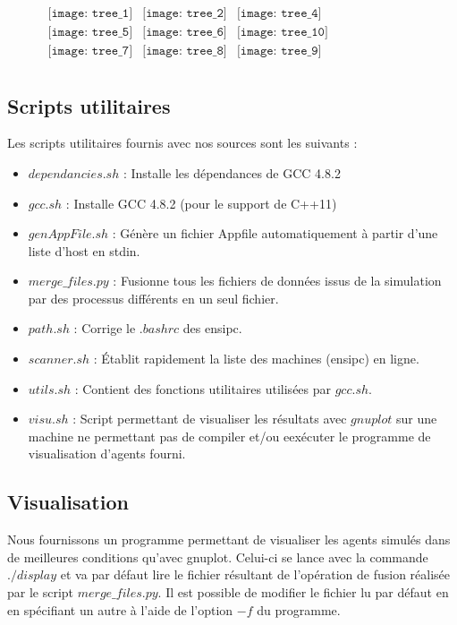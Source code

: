     \begin{figure}[h]
    \begin{center}$
        \begin{array}{ccc}
            \texttt{[image: tree\_1]} &
            \texttt{[image: tree\_2]} &
            \texttt{[image: tree\_4]} \\
            \texttt{[image: tree\_5]} &
            \texttt{[image: tree\_6]} &
            \texttt{[image: tree\_10]} \\
            \texttt{[image: tree\_7]} &
            \texttt{[image: tree\_8]} &
            \texttt{[image: tree\_9]} \\
        \end{array}$
    \end{center}
\end{figure}

\subsection{Scripts utilitaires}
Les scripts utilitaires fournis avec nos sources sont les suivants :
\begin{itemize}
    \item $dependancies.sh$ : Installe les dépendances de GCC 4.8.2 
    \item $gcc.sh$          : Installe GCC 4.8.2 (pour le support de C++11)
    \item $genAppFile.sh$   : Génère un fichier Appfile automatiquement à partir d'une liste d'host en stdin.
    \item $merge\_files.py$ : Fusionne tous les fichiers de données issus de la simulation par des processus différents en un seul fichier.
    \item $path.sh$         : Corrige le $.bashrc$ des ensipc.
    \item $scanner.sh$      : Établit rapidement la liste des machines (ensipc) en ligne.
    \item $utils.sh$        : Contient des fonctions utilitaires utilisées par $gcc.sh$.
    \item $visu.sh$         : Script permettant de visualiser les résultats avec $gnuplot$ sur une machine ne permettant pas de compiler et/ou eexécuter le programme de visualisation d'agents fourni.
\end{itemize}


\subsection{Visualisation}
Nous fournissons un programme permettant de visualiser les agents simulés dans de meilleures conditions qu'avec gnuplot.
Celui-ci se lance avec la commande $./display$ et va par défaut lire le fichier résultant de l'opération de fusion réalisée par le script $merge\_files.py$. Il est possible de modifier le fichier lu par défaut en en spécifiant un autre à l'aide de l'option $-f$ du programme.\\

